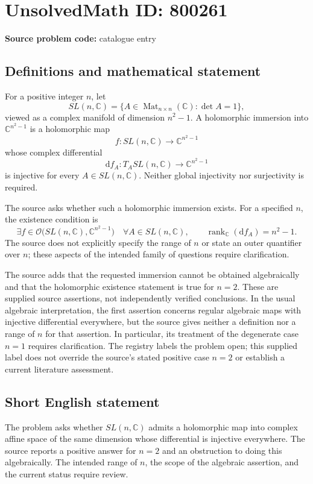\documentclass[11pt]{article}
\newcommand{\C}{\mathbb{C}}
\begin{document}
\section*{UnsolvedMath ID: 800261}
\textbf{Source problem code:} catalogue entry
\subsection{Definitions and mathematical statement}
For a positive integer \(n\), let
\[
SL(n,\C)=\{A\in\operatorname{Mat}_{n\times n}(\C):\det A=1\},
\]
viewed as a complex manifold of dimension \(n^2-1\). A holomorphic immersion into \(\C^{n^2-1}\) is a holomorphic map
\[
f:SL(n,\C)\longrightarrow\C^{n^2-1}
\]
whose complex differential
\[
\mathrm{d}f_A:T_A SL(n,\C)\longrightarrow\C^{n^2-1}
\]
is injective for every \(A\in SL(n,\C)\). Neither global injectivity nor surjectivity is required.

The source asks whether such a holomorphic immersion exists. For a specified \(n\), the existence condition is
\[
\exists f\in\mathcal O\bigl(SL(n,\C),\C^{n^2-1}\bigr)
\quad\forall A\in SL(n,\C),\qquad
\operatorname{rank}_{\C}(\mathrm{d}f_A)=n^2-1.
\]
The source does not explicitly specify the range of \(n\) or state an outer quantifier over \(n\); these aspects of the intended family of questions require clarification.

The source adds that the requested immersion cannot be obtained algebraically and that the holomorphic existence statement is true for \(n=2\). These are supplied source assertions, not independently verified conclusions. In the usual algebraic interpretation, the first assertion concerns regular algebraic maps with injective differential everywhere, but the source gives neither a definition nor a range of \(n\) for that assertion. In particular, its treatment of the degenerate case \(n=1\) requires clarification. The registry labels the problem open; this supplied label does not override the source's stated positive case \(n=2\) or establish a current literature assessment.
\subsection{Short English statement}
The problem asks whether \(SL(n,\C)\) admits a holomorphic map into complex affine space of the same dimension whose differential is injective everywhere. The source reports a positive answer for \(n=2\) and an obstruction to doing this algebraically. The intended range of \(n\), the scope of the algebraic assertion, and the current status require review.
\end{document}
